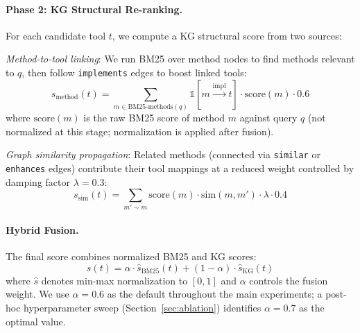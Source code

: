 \documentclass[11pt,a4paper]{article}
\begin{document}
\paragraph{Phase 2: KG Structural Re-ranking.}
For each candidate tool $t$, we compute a KG structural score from two sources:

\textit{Method-to-tool linking}: We run BM25 over method nodes to find methods relevant to $q$, then follow \texttt{implements} edges to boost linked tools:
$$s_{\text{method}}(t) = \sum_{m \in \text{BM25-methods}(q)} \mathbb{1}[m \xrightarrow{\text{impl}} t] \cdot \text{score}(m) \cdot 0.6$$
where $\text{score}(m)$ is the raw BM25 score of method $m$ against query $q$ (not normalized at this stage; normalization is applied after fusion).

\textit{Graph similarity propagation}: Related methods (connected via \texttt{similar} or \texttt{enhances} edges) contribute their tool mappings at a reduced weight controlled by damping factor $\lambda = 0.3$:
$$s_{\text{sim}}(t) = \sum_{m' \sim m} \text{score}(m) \cdot \text{sim}(m, m') \cdot \lambda \cdot 0.4$$

\paragraph{Hybrid Fusion.}
The final score combines normalized BM25 and KG scores:
$$s(t) = \alpha \cdot \hat{s}_{\text{BM25}}(t) + (1 - \alpha) \cdot \hat{s}_{\text{KG}}(t)$$
where $\hat{s}$ denotes min-max normalization to $[0, 1]$ and $\alpha$ controls the fusion weight. We use $\alpha = 0.6$ as the default throughout the main experiments; a post-hoc hyperparameter sweep (Section~\ref{sec:ablation}) identifies $\alpha = 0.7$ as the optimal value.
\end{document}
